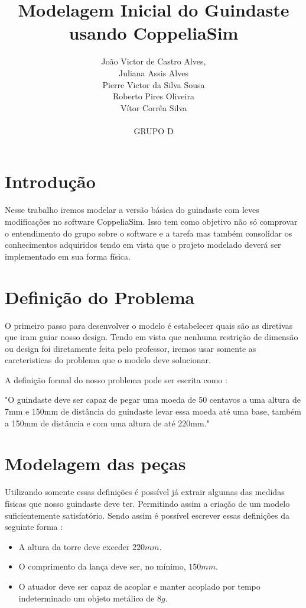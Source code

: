 \documentclass{article}
\title{ Modelagem Inicial do Guindaste usando CoppeliaSim}
\author{João Victor de Castro Alves,\\
        Juliana Assis Alves\\
        Pierre Victor da Silva Sousa \\
        Roberto Pires Oliveira \\
        Vítor Corrêa Silva \\
        \\
        GRUPO D}
\date{\vspace{-5ex}} %
\begin{document}
\maketitle
\thispagestyle{firstpage}
\section{Introdução}

    Nesse trabalho iremos modelar a versão básica do guindaste com leves modificações 
    no software CoppeliaSim. Isso tem como objetivo  não só comprovar o entendimento do grupo 
    sobre o software e a tarefa mas também consolidar os conhecimentos adquiridos tendo em vista 
    que o projeto modelado deverá ser implementado em sua forma física.
    
\section{Definição do Problema}

    O primeiro passo para desenvolver o modelo é estabelecer quais são as diretivas que iram 
    guiar nosso design. Tendo em vista que nenhuma restrição de dimensão ou design foi diretamente feita pelo 
    professor, iremos usar somente as carcteristicas do problema que o modelo deve solucionar.

    A definição formal do nosso problema pode ser escrita como :

    \begin{center}
        "O guindaste deve ser capaz de pegar uma moeda de 50 centavos a uma altura de 7mm e 150mm de 
        distância do guindaste levar essa moeda até uma base, também a 150mm de distância e com uma 
        altura de até 220mm."
    \end{center}

\section{Modelagem das peças}   

    Utilizando somente essas definições é possível já extrair algumas das medidas físicas que nosso 
    guindaste deve ter. Permitindo assim a criação de um modelo suficientemente satisfatório. Sendo 
    assim é possível escrever essas definições da seguinte forma :

    \begin{itemize}
        \item A altura da torre deve exceder \(220mm\).
        \item O comprimento da lança deve ser, no mínimo, \(150mm\).
        \item O atuador deve ser capaz de acoplar e manter acoplado por tempo indeterminado um objeto metálico de \(8g\).
    \end{itemize}
\end{document}
